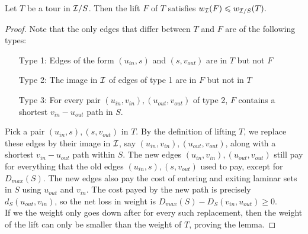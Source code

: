\documentclass[./main.tex]{subfiles}
\begin{document}
	\begin{lemma}\label{lemm:3:lift-c}
		Let $T$ be a tour in $\mathcal{I}/S$. Then the lift $F$ of $T$ satisfies $w_{\mathcal{I}}(F) \leqslant w_{\mathcal{I}/S}(T).$
	\end{lemma}
	\begin{proof}
	Note that the only edges that differ between $T$ and $F$ are of the following types:
	\begin{itemize}
		\item[Type 1:] Edges of the form $(u_{in},s)$ and $(s,v_{out})$ are in $T$ but not $F$
		\item[Type 2:] The image in $\mathcal{I}$ of edges of type 1 are in $F$ but not in $T$
		\item[Type 3:] For every pair $(u_{in}, v_{in}),(u_{out},v_{out})$ of type 2, $F$ contains a shortest $v_{in}-u_{out}$ path in $S$.
	\end{itemize}
Pick a pair $(u_{in}, s),(s,v_{out})$ in $T$. By the definition of lifting $T$, we replace these edges by their image in $\mathcal{I}$, say $(u_{in}, v_{in}),(u_{out},v_{out})$, along with a shortest $v_{in}-u_{out}$ path within $S$. The new edges $(u_{in}, v_{in}),(u_{out},v_{out})$ still pay for everything that the old edges $(u_{in}, s),(s,v_{out})$ used to pay, except for $D_{max}(S)$. The new edges also pay the cost of entering and exiting laminar sets in $S$ using $u_{out}$ and $v_{in}$. The cost payed by the new path is precisely $d_S(u_{out},v_{in})$, so the net loss in weight is $D_{max}(S) - D_{S}(v_{in}, u_{out})\geq 0$.\vspace{2mm}
\\If we the weight only goes down after for every such replacement, then the weight of the lift can only be smaller than the weight of $T$, proving the lemma.
	\end{proof}
\end{document}

